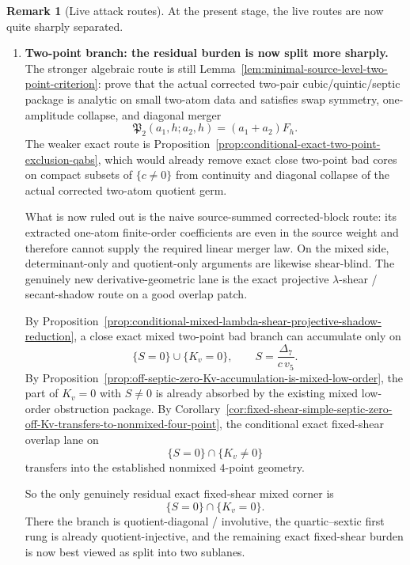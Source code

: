 \documentclass[11pt,a4paper]{amsart}
\theoremstyle{plain}
\theoremstyle{definition}
\newtheorem{remark}[theorem]{Remark}
\begin{document}
\begin{remark}[Live attack routes]
\label{rem:live-attack-routes}
At the present stage, the live routes are now quite sharply separated.

\begin{enumerate}
\item
\textbf{Two-point branch: the residual burden is now split more sharply.}
The stronger algebraic route is still
Lemma~\ref{lem:minimal-source-level-two-point-criterion}: prove that the actual
corrected two-pair cubic/quintic/septic package is analytic on small two-atom
data and satisfies swap symmetry, one-amplitude collapse, and diagonal merger
\[
\mathfrak P_2(a_1,h;a_2,h)=(a_1+a_2)F_h.
\]
The weaker exact route is
Proposition~\ref{prop:conditional-exact-two-point-exclusion-qabs}, which would
already remove exact close two-point bad cores on compact subsets of
$\{c\neq 0\}$ from continuity and diagonal collapse of the actual corrected
two-atom quotient germ.

What is now ruled out is the naive source-summed corrected-block route: its
extracted one-atom finite-order coefficients are even in the source weight and
therefore cannot supply the required linear merger law. On the mixed side,
determinant-only and quotient-only arguments are likewise shear-blind. The
genuinely new derivative-geometric lane is the exact projective
$\lambda$-shear / secant-shadow route on a good overlap patch.

By
Proposition~\ref{prop:conditional-mixed-lambda-shear-projective-shadow-reduction},
a close exact mixed two-point bad branch can accumulate only on
\[
\{S=0\}\cup\{K_v=0\},
\qquad
S=\frac{\Delta_7}{c\,v_5}.
\]
By
Proposition~\ref{prop:off-septic-zero-Kv-accumulation-is-mixed-low-order},
the part of $K_v=0$ with $S\neq 0$ is already absorbed by the existing
mixed low-order obstruction package. By
Corollary~\ref{cor:fixed-shear-simple-septic-zero-off-Kv-transfers-to-nonmixed-four-point},
the conditional exact fixed-shear overlap lane on
\[
\{S=0\}\cap\{K_v\neq 0\}
\]
transfers into the established nonmixed $4$-point geometry.

So the only genuinely residual exact fixed-shear mixed corner is
\[
\{S=0\}\cap\{K_v=0\}.
\]
There the branch is quotient-diagonal / involutive, the quartic--sextic first
rung is already quotient-injective, and the remaining exact fixed-shear burden
is now best viewed as split into two sublanes.


\end{enumerate}
\end{remark}
\end{document}
